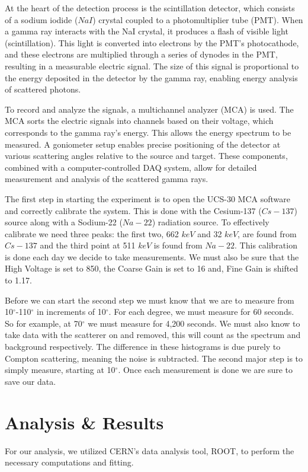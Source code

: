 \documentclass[a4paper,12pt,english]{all-in-one} %
\begin{document}
\begin{multicols}{2}
{At the heart of the detection process is the scintillation detector, which consists of a sodium iodide ($NaI$) crystal coupled to a photomultiplier tube (PMT). When a gamma ray interacts with the NaI crystal, it produces a flash of visible light (scintillation). This light is converted into electrons by the PMT’s photocathode, and these electrons are multiplied through a series of dynodes in the PMT, resulting in a measurable electric signal. The size of this signal is proportional to the energy deposited in the detector by the gamma ray, enabling energy analysis of scattered photons.

To record and analyze the signals, a multichannel analyzer (MCA) is used. The MCA sorts the electric signals into channels based on their voltage, which corresponds to the gamma ray’s energy. This allows the energy spectrum to be measured. A goniometer setup enables precise positioning of the detector at various scattering angles relative to the source and target. These components, combined with a computer-controlled DAQ system, allow for detailed measurement and analysis of the scattered gamma rays.

The first step in starting the experiment is to open the UCS-30 MCA software and correctly calibrate the system. This is done with the Cesium-137 ($Cs-137$) source along with a Sodium-22 ($Na-22$) radiation source. To effectively calibrate we need three peaks: the first two, 662 $keV$ and 32 $keV$, are found from $Cs-137$ and the third point at 511 $keV$ is found from $Na-22$. This calibration is done each day we decide to take measurements. We must also be sure that the High Voltage is set to 850, the Coarse Gain is set to 16 and, Fine Gain is shifted to 1.17.

Before we can start the second step we must know that we are to measure from 10$^\circ$-110$^\circ$ in increments of 10$^\circ$. For each degree, we must measure for 60 seconds. So for example, at 70$^\circ$ we must measure for 4,200 seconds. We must also know to take data with the scatterer on and removed, this will count as the spectrum and background respectively. The difference in these histograms is due purely to Compton scattering, meaning the noise is subtracted. The second major step is to simply measure, starting at 10$^\circ$. Once each measurement is done we are sure to save our data.  
}

\section*{Analysis \& Results}
{
For our analysis, we utilized CERN's data analysis tool, ROOT, to perform the necessary computations and fitting.

}
\end{multicols}
\end{document}
